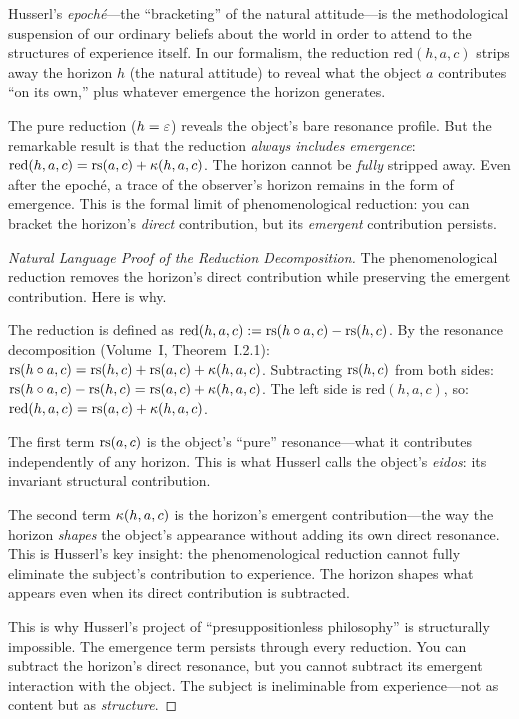 \begin{interpretation}
\label{interp:epoche}
Husserl's \emph{epoch\'e}---the ``bracketing'' of the natural attitude---is the
methodological suspension of our ordinary beliefs about the world in order to
attend to the structures of experience itself. In our formalism, the reduction
$\mathrm{red}(h, a, c)$ strips away the horizon $h$ (the natural attitude) to
reveal what the object $a$ contributes ``on its own,'' plus whatever
emergence the horizon generates.

The pure reduction ($h = \varepsilon$) reveals the object's bare resonance profile.
But the remarkable result is that the reduction \emph{always includes emergence}:
$\mathrm{red}(h, a, c) = \mathrm{rs}(a,c) + \kappa(h,a,c)$. The horizon cannot be
\emph{fully} stripped away. Even after the epoch\'e, a trace of the observer's
horizon remains in the form of emergence. This is the formal limit of
phenomenological reduction: you can bracket the horizon's \emph{direct}
contribution, but its \emph{emergent} contribution persists.
\end{interpretation}

\begin{proof}[Natural Language Proof of the Reduction Decomposition]
The phenomenological reduction removes the horizon's direct contribution
while preserving the emergent contribution. Here is why.

The reduction is defined as $\mathrm{red}(h, a, c) := \mathrm{rs}(h \circ a, c) - \mathrm{rs}(h, c)$.
By the resonance decomposition (Volume~I, Theorem~I.2.1):
$\mathrm{rs}(h \circ a, c) = \mathrm{rs}(h, c) + \mathrm{rs}(a, c) + \kappa(h, a, c)$.
Subtracting $\mathrm{rs}(h, c)$ from both sides:
$\mathrm{rs}(h \circ a, c) - \mathrm{rs}(h, c) = \mathrm{rs}(a, c) + \kappa(h, a, c)$.
The left side is $\mathrm{red}(h, a, c)$, so:
$\mathrm{red}(h, a, c) = \mathrm{rs}(a, c) + \kappa(h, a, c)$.

The first term $\mathrm{rs}(a, c)$ is the object's ``pure'' resonance---what it
contributes independently of any horizon. This is what Husserl calls the
object's \emph{eidos}: its invariant structural contribution.

The second term $\kappa(h, a, c)$ is the horizon's emergent contribution---the
way the horizon \emph{shapes} the object's appearance without adding its own
direct resonance. This is Husserl's key insight: the phenomenological reduction
cannot fully eliminate the subject's contribution to experience. The horizon
shapes what appears even when its direct contribution is subtracted.

This is why Husserl's project of ``presuppositionless philosophy'' is
structurally impossible. The emergence term persists through every reduction.
You can subtract the horizon's direct resonance, but you cannot subtract its
emergent interaction with the object. The subject is ineliminable from
experience---not as content but as \emph{structure}.
\end{proof}

